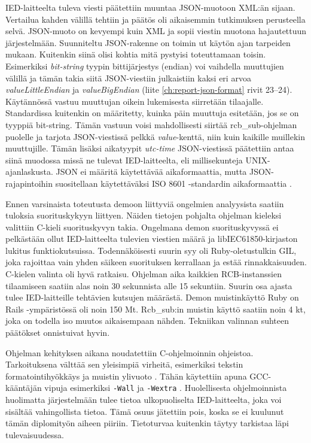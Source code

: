 IED-laitteelta tuleva viesti päätettiin muuntaa JSON-muotoon XML:än sijaan. Vertailua kahden välillä tehtiin ja päätös oli aikaisemmin tutkimuksen perusteella selvä. JSON-muoto on kevyempi kuin XML ja sopii viestin muotona hajautettuun järjestelmään. Suunniteltu JSON-rakenne on toimin	ut käytön ajan tarpeiden mukaan. Kuitenkin siinä olisi kohtia mitä pystyisi toteuttamaan toisin. Esimerkiksi \emph{bit-string} tyypin bittijärjestys (endian) voi vaihdella muuttujien välillä ja tämän takia siitä JSON-viestiin julkaistiin kaksi eri arvoa \emph{valueLittleEndian} ja \emph{valueBigEndian} (liite \ref{ch:report-json-format} rivit 23--24). Käytännössä vastuu muuttujan oikein lukemisesta siirretään tilaajalle. Standardissa kuitenkin on määritetty, kuinka päin muuttuja esitetään, jos se on tyyppiä bit-string. Tämän vastuun voisi mahdollisesti siirtää rcb\_sub-ohjelman puolelle ja tarjota JSON-viestissä pelkkä \emph{value}-kenttä, niin kuin kaikille muillekin muuttujille. Tämän lisäksi aikatyypit \emph{utc-time} JSON-viestissä päätettiin antaa siinä muodossa missä ne tulevat IED-laitteelta, eli millisekunteja UNIX-ajanlaskusta. JSON ei määritä käytettävää aikaformaattia, mutta JSON-rajapintoihin suositellaan käytettäväksi ISO 8601 -standardin aikaformaattia \cite{json-api-specification}.

Ennen varsinaista toteutusta demoon liittyviä ongelmien analyysista saatiin tuloksia suorituskykyyn liittyen. Näiden tietojen pohjalta ohjelman kieleksi valittiin C-kieli suorituskyvyn takia. Ongelmana demon suorituskyvyssä ei pelkästään ollut IED-laitteelta tulevien viestien määrä ja libIEC61850-kirjaston lukitus funktiokutsuissa. Todennäköisesti suurin syy oli Ruby-oletustulkin GIL, joka rajoittaa vain yhden säikeen suorituksen kerrallaan ja estää rinnakkaisuuden. C-kielen valinta oli hyvä ratkaisu. Ohjelman aika kaikkien RCB-instanssien tilaamiseen saatiin alas noin 30 sekunnista alle 15 sekuntiin. Suurin osa ajasta tulee IED-laitteille tehtävien kutsujen määrästä. Demon muistinkäyttö Ruby on Rails -ympäristössä oli noin 150 Mt. Rcb\_sub:in muistin käyttö saatiin noin 4 kt, joka on todella iso muutos aikaisempaan nähden. Tekniikan valinnan suhteen päätökset onnistuivat hyvin.

Ohjelman kehityksen aikana noudatettiin C-ohjelmoinnin ohjeistoa. Tarkoituksena välttää sen yleisimpiä virheitä, esimerkiksi tekstin formatointihyökkäys \cite{format-string-attack} ja muistin ylivuoto \cite{buffer-overflow-attack}. Tähän käytettiin apuna GCC-kääntäjän vipuja esimerkiksi \texttt{-Wall} ja \texttt{-Wextra} \cite{gcc-manual-warnings}. Huolellisesta ohjelmoinnista huolimatta järjestelmään tulee tietoa ulkopuoliselta IED-laitteelta, joka voi sisältää vahingollista tietoa. Tämä osuus jätettiin pois, koska se ei kuulunut tämän diplomityön aiheen piiriin. Tietoturvaa kuitenkin täytyy tarkistaa läpi tulevaisuudessa.

